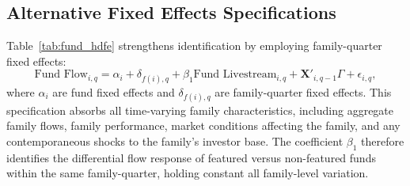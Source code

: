 \documentclass[12pt]{article}
\begin{document}



\subsection{Alternative Fixed Effects Specifications}\label{subsec:alternative_fe}

Table~\ref{tab:fund_hdfe} strengthens identification by employing family-quarter fixed effects:
\begin{equation}
    \label{eq:fund_hdfe_appendix}
    \text{Fund Flow}_{i,q} = \alpha_i + \delta_{f(i),q} + \beta_1 \text{Fund Livestream}_{i,q} + \mathbf{X}'_{i,q-1} \Gamma + \epsilon_{i,q},
\end{equation}
where $\alpha_i$ are fund fixed effects and $\delta_{f(i),q}$ are family-quarter fixed effects. This specification absorbs all time-varying family characteristics, including aggregate family flows, family performance, market conditions affecting the family, and any contemporaneous shocks to the family's investor base. The coefficient $\beta_1$ therefore identifies the differential flow response of featured versus non-featured funds within the same family-quarter, holding constant all family-level variation.
\end{document}
